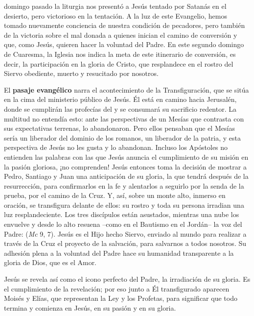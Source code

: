 \begin{body}
 domingo pasado la liturgia nos presentó a Jesús tentado por Satanás en el desierto, pero victorioso en la tentación. A la luz de este Evangelio, hemos tomado nuevamente conciencia de nuestra condición de pecadores, pero también de la victoria sobre el mal donada a quienes inician el camino de conversión y que, como Jesús, quieren hacer la voluntad del Padre. En este segundo domingo de Cuaresma, la Iglesia nos indica la meta de este itinerario de conversión, es decir, la participación en la gloria de Cristo, que resplandece en el rostro del Siervo obediente, muerto y resucitado por nosotros.

El \textbf{pasaje evangélico} narra el acontecimiento de la Transfiguración, que se sitúa en la cima del ministerio público de Jesús. Él está en camino hacia Jerusalén, donde se cumplirán las profecías del  y se consumará su sacrificio redentor. La multitud no entendía esto: ante las perspectivas de un Mesías que contrasta con sus expectativas terrenas, lo abandonaron. Pero ellos pensaban que el Mesías sería un liberador del dominio de los romanos, un liberador de la patria, y esta perspectiva de Jesús no les gusta y lo abandonan. Incluso los Apóstoles no entienden las palabras con las que Jesús anuncia el cumplimiento de su misión en la pasión gloriosa, ¡no comprenden! Jesús entonces toma la decisión de mostrar a Pedro, Santiago y Juan una anticipación de su gloria, la que tendrá después de la resurrección, para confirmarlos en la fe y alentarlos a seguirlo por la senda de la prueba, por el camino de la Cruz. Y, así, sobre un monte alto, inmerso en oración, se transfigura delante de ellos: su rostro y toda su persona irradian una luz resplandeciente. Los tres discípulos están asustados, mientras una nube los envuelve y desde lo alto resuena –como en el Bautismo en el Jordán– la voz del Padre:  (\textit{Mc} 9, 7). Jesús es el Hijo hecho Siervo, enviado al mundo para realizar a través de la Cruz el proyecto de la salvación, para salvarnos a todos nosotros. Su adhesión plena a la voluntad del Padre hace su humanidad transparente a la gloria de Dios, que es el Amor.

Jesús se revela así como el icono perfecto del Padre, la irradiación de su gloria. Es el cumplimiento de la revelación; por eso junto a Él transfigurado aparecen Moisés y Elías, que representan la Ley y los Profetas, para significar que todo termina y comienza en Jesús, en su pasión y en su gloria.


\end{body}
